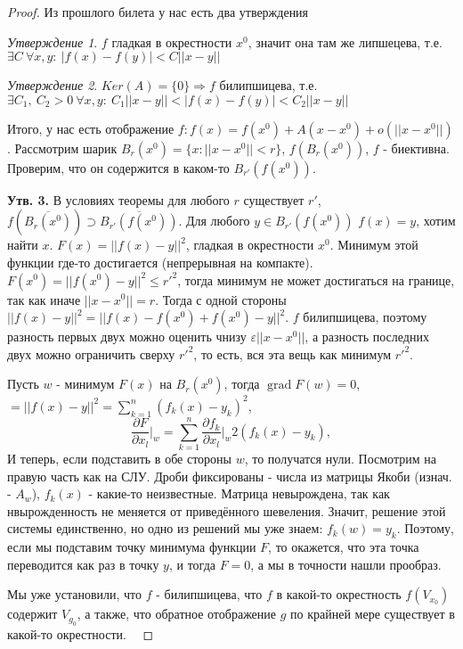 \documentclass[a4paper]{article}
\theoremstyle{indented}
\theoremstyle{definition}
\theoremstyle{remark}
\newtheorem{stat}{Утверждение}
\DeclareMathOperator{\grad}{grad}
\begin{document}
\begin{proof}

    Из прошлого билета у нас есть два утверждения

\begin{stat}
    $f$ гладкая в окрестности $x^0$, значит она там же липшецева, т.е. $\exists C \ \forall x,y:\ |f(x)-f(y)| < C ||x-y||$
\end{stat}

\begin{stat}
    $Ker(A)=\{0\} \Rightarrow f$ билипшицева, т.е. $\exists C_1,\ C_2 > 0 \ \forall x,y: \ C_1||x-y|| < |f(x)-f(y)| < C_2 ||x-y||$
\end{stat}

    Итого, у нас есть отображение $f:f(x)=f(x^0)+A(x-x^0)+o(||x-x^0||)$. Рассмотрим шарик $B_r(x^0)=\{x:||x-x^0||<r\}$, $f(B_r(x^0))$, $f$ - биективна. Проверим, что он содержится в каком-то $B_{r'}(f(x^0))$. \ 

    \textbf{Утв. 3.} В условиях теоремы для любого $r$ существует $r'$, $f(\overline{B_r(x^0)})\supset \overline{B_{r'}(f(x^0))}$. Для любого $y\in B_{r'}(f(x^0))$ $f(x)=y$, хотим найти $x$. $F(x)= ||f(x)-y||^2$, гладкая в окрестности $x^0$. Минимум этой функции где-то достигается (непрерывная на компакте). $F(x^0)= ||f(x^0)-y||^2\leq r'^2$, тогда минимум не может достигаться на границе, так как иначе $||x-x^0||=r$. Тогда с одной стороны $||f(x)-y||^2=||f(x)-f(x^0)+f(x^0)-y||^2$. $f$ билипшицева, поэтому разность первых двух можно оценить чнизу $\varepsilon||x-x^0||$, а разность последних двух можно ограничить сверху $r'^2$, то есть, вся эта вещь как минимум $r'^2$. \ 

    Пусть $w$ - минимум $F(x)$ на $B_r(x^0)$, тогда $\grad F(w)=0$,  $=||f(x)-y||^2 = \sum_{k=1}^n(f_k(x)-y_k)^2$, 
    \[
        \frac{\partial F}{\partial x_l}\bigg|_w = \sum_{k=1}^n\frac{\partial f_k}{\partial x_l}\bigg|_w 2(f_k(x)-y_k), 
    \]
    И теперь, если подставить в обе стороны $w$, то получатся нули. Посмотрим на правую часть как на СЛУ. Дроби фиксированы - числа из матрицы Якоби (изнач. - $A_w$), $f_k(x)$ - какие-то неизвестные. Матрица невырождена, так как нвырожденность не меняется от приведённого шевеления. Значит, решение этой системы единственно, но одно из решений мы уже знаем: $f_k(w)=y_k$. Поэтому, если мы подставим точку минимума функции $F$, то окажется, что эта точка переводится как раз в точку $y$, и тогда $F=0$, а мы в точности нашли прообраз.

    Мы уже установили, что $f$ - билипшицева, что $f$ в какой-то окрестность $f(V_{x_0})$ содержит $V_{g_0}$, а также, что обратное отображение $g$ по крайней мере существует в какой-то окрестности. \ 


\end{proof}
\end{document}
